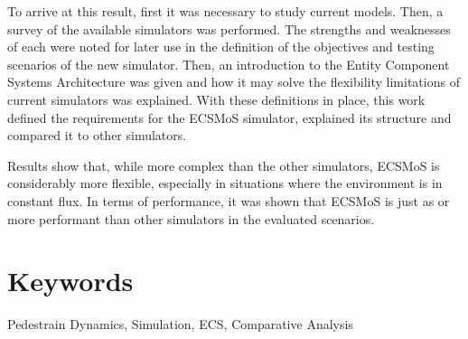 \documentclass[twoside, 11pt]{article}
\begin{document}
To arrive at this result, first it was necessary to study current models. Then, a survey of the available simulators was performed. The strengths and weaknesses of each were noted for later use in the definition of the objectives and testing scenarios of the new simulator. Then, an introduction to the Entity Component Systems Architecture was given and how it may solve the flexibility limitations of current simulators was explained. With these definitions in place, this work defined the requirements for the ECSMoS simulator, explained its structure and compared it to other simulators. 

Results show that, while more complex than the other simulators, ECSMoS is considerably more flexible, especially in situations where the environment is in constant flux. In terms of performance, it was shown that ECSMoS is just as or more performant than other simulators in the evaluated scenarios. 


\section*{Keywords}

Pedestrain Dynamics, Simulation, ECS, Comparative Analysis

\clearpage            %
\null                %
\newpage             %

\printglossary[type=\acronymtype,nogroupskip=true,nonumberlist, title=List of Abbreviations]

\clearpage            %
\null                %
\newpage             %

\renewcommand{\contentsname}{General Index}
\tableofcontents

\clearpage            %
\null                %
\newpage             %

\renewcommand{\listfigurename}{Figure Index}
\listoffigures

\clearpage            %
\null                %
\newpage             %

\renewcommand{\listtablename}{Table Index}
\listoftables

\clearpage            %
\null                %
\newpage             %
\end{document}
